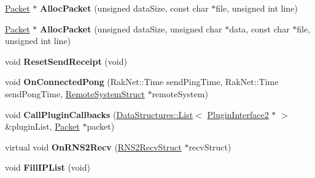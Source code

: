 \begin{DoxyCompactItemize}
\item 
\hypertarget{class_rak_net_1_1_rak_peer_a191bdf4de1659d93828e57eff94e599b}{\hyperlink{struct_rak_net_1_1_packet}{Packet} $\ast$ {\bfseries Alloc\-Packet} (unsigned data\-Size, const char $\ast$file, unsigned int line)}\label{class_rak_net_1_1_rak_peer_a191bdf4de1659d93828e57eff94e599b}

\item 
\hypertarget{class_rak_net_1_1_rak_peer_a9cf37e82a81732c1aec7cb05cb03c470}{\hyperlink{struct_rak_net_1_1_packet}{Packet} $\ast$ {\bfseries Alloc\-Packet} (unsigned data\-Size, unsigned char $\ast$data, const char $\ast$file, unsigned int line)}\label{class_rak_net_1_1_rak_peer_a9cf37e82a81732c1aec7cb05cb03c470}

\item 
\hypertarget{class_rak_net_1_1_rak_peer_a97173db13b94860be11f58beb8ded907}{void {\bfseries Reset\-Send\-Receipt} (void)}\label{class_rak_net_1_1_rak_peer_a97173db13b94860be11f58beb8ded907}

\item 
\hypertarget{class_rak_net_1_1_rak_peer_a719b731e0d50a6d2e2bebbf4f40fb730}{void {\bfseries On\-Connected\-Pong} (Rak\-Net\-::\-Time send\-Ping\-Time, Rak\-Net\-::\-Time send\-Pong\-Time, \hyperlink{struct_rak_net_1_1_rak_peer_1_1_remote_system_struct}{Remote\-System\-Struct} $\ast$remote\-System)}\label{class_rak_net_1_1_rak_peer_a719b731e0d50a6d2e2bebbf4f40fb730}

\item 
\hypertarget{class_rak_net_1_1_rak_peer_a2d0cb0ad14f78af4c44fb9afd5876cc3}{void {\bfseries Call\-Plugin\-Callbacks} (\hyperlink{class_data_structures_1_1_list}{Data\-Structures\-::\-List}$<$ \hyperlink{class_rak_net_1_1_plugin_interface2}{Plugin\-Interface2} $\ast$ $>$ \&plugin\-List, \hyperlink{struct_rak_net_1_1_packet}{Packet} $\ast$packet)}\label{class_rak_net_1_1_rak_peer_a2d0cb0ad14f78af4c44fb9afd5876cc3}

\item 
\hypertarget{class_rak_net_1_1_rak_peer_a170a59835dea32d3a7a986a2cd2647e4}{virtual void {\bfseries On\-R\-N\-S2\-Recv} (\hyperlink{struct_rak_net_1_1_r_n_s2_recv_struct}{R\-N\-S2\-Recv\-Struct} $\ast$recv\-Struct)}\label{class_rak_net_1_1_rak_peer_a170a59835dea32d3a7a986a2cd2647e4}

\item 
\hypertarget{class_rak_net_1_1_rak_peer_a2f63d132c97326d07b3a42ce2e114a0f}{void {\bfseries Fill\-I\-P\-List} (void)}\label{class_rak_net_1_1_rak_peer_a2f63d132c97326d07b3a42ce2e114a0f}

\end{DoxyCompactItemize}
